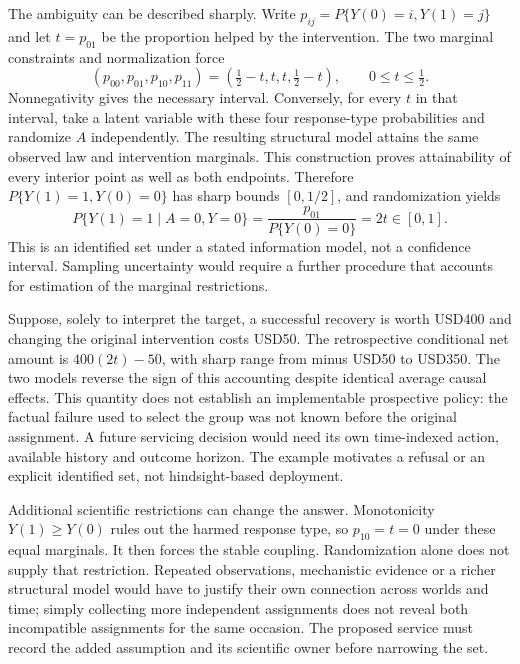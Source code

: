 The ambiguity can be described sharply. Write $p_{ij}=P\{Y(0)=i,Y(1)=j\}$
and let $t=p_{01}$ be the proportion helped by the intervention. The two
marginal constraints and normalization force
\begin{equation}
 (p_{00},p_{01},p_{10},p_{11})
   =\left(\tfrac12-t,t,t,\tfrac12-t\right),
 \qquad 0\leq t\leq\tfrac12.
\label{exec18:pyid-sharp}
\end{equation}
Nonnegativity gives the necessary interval. Conversely, for every $t$ in that
interval, take a latent variable with these four response-type probabilities
and randomize $A$ independently. The resulting structural model attains the
same observed law and intervention marginals. This construction proves
attainability of every interior point as well as both endpoints. Therefore
$P\{Y(1)=1,Y(0)=0\}$ has sharp bounds $[0,1/2]$, and randomization yields
\begin{equation}
 P\{Y(1)=1\mid A=0,Y=0\}
 =\frac{p_{01}}{P\{Y(0)=0\}}=2t\in[0,1].
\label{exec18:pyid-bounds}
\end{equation}
This is an identified set under a stated information model, not a confidence
interval. Sampling uncertainty would require a further procedure that accounts
for estimation of the marginal restrictions.\citep{exec18_pyid_coupling}

Suppose, solely to interpret the target, a successful recovery is worth
USD400 and changing the original intervention costs USD50. The retrospective
conditional net amount is $400(2t)-50$, with sharp range from minus USD50 to
USD350. The two models reverse the sign of this accounting despite identical
average causal effects. This quantity does not establish an implementable
prospective policy: the factual failure used to select the group was not
known before the original assignment. A future servicing decision would need
its own time-indexed action, available history and outcome horizon. The
example motivates a refusal or an explicit identified set, not hindsight-based
deployment.\citep{exec18_pyid_coupling}

Additional scientific restrictions can change the answer. Monotonicity
$Y(1)\geq Y(0)$ rules out the harmed response type, so $p_{10}=t=0$ under
these equal marginals. It then forces the stable coupling. Randomization alone
does not supply that restriction. Repeated observations, mechanistic evidence
or a richer structural model would have to justify their own connection across
worlds and time; simply collecting more independent assignments does not reveal
both incompatible assignments for the same occasion. The proposed service
must record the added assumption and its scientific owner before narrowing
the set.\citep{exec18_pyid_coupling,exec18_pyid_contract}

